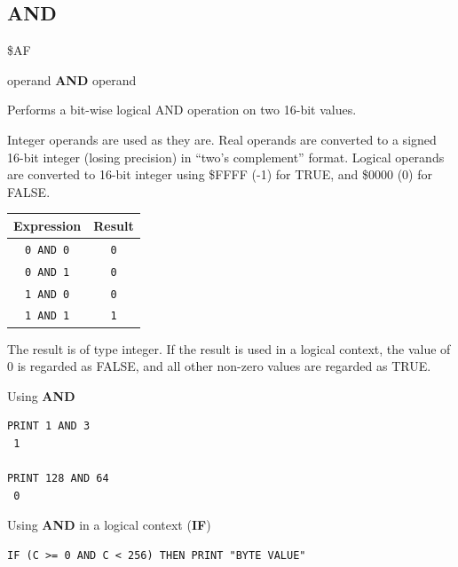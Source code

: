 \subsection{AND}
\begin{description}[leftmargin=2cm,style=nextline]
\item [Token:]    \$AF

\item [Format:]   operand {\bf AND} operand

\item [Usage:]    Performs a bit-wise logical AND operation on two 16-bit values.

                  Integer operands are used as they are. Real operands are converted to a signed 16-bit integer (losing precision) in ``two's complement'' format. Logical operands are converted to 16-bit integer using \$FFFF (-1) for TRUE, and \$0000 (0) for FALSE.

                  \begin{center}
                  \setlength{\tabcolsep}{1mm}
                  \begin{tabular}{|c|c|}
                     \hline
                        {\bf Expression} & {\bf Result}  \\
                     \hline
                        \texttt{0 AND 0} & \texttt{0} \\
                        \texttt{0 AND 1} & \texttt{0} \\
                        \texttt{1 AND 0} & \texttt{0} \\
                        \texttt{1 AND 1} & \texttt{1} \\
                     \hline
                  \end{tabular}
                  \end{center}

\item [Remarks:]  The result is of type integer. If the result is used in a logical context, the value of 0 is regarded as FALSE, and all other non-zero values are regarded as TRUE.

\item [Examples:] Using {\bf AND}

\begin{tcolorbox}[colback=black,coltext=white]
\verbatimfont{\codefont}
\begin{verbatim}
PRINT 1 AND 3
 1

PRINT 128 AND 64
 0
\end{verbatim}
\end{tcolorbox}

                  Using {\bf AND} in a logical context ({\bf IF})

\begin{tcolorbox}[colback=black,coltext=white]
\verbatimfont{\codefont}
\begin{verbatim}
IF (C >= 0 AND C < 256) THEN PRINT "BYTE VALUE"
\end{verbatim}
\end{tcolorbox}
\end{description}

